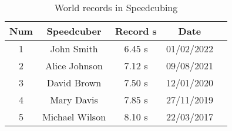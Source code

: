 \begin{table}[h]
\centering
\begin{tabular}{|c|c|c|c|c|}
\hline
Num & Speedcuber & Record s & Date \\
\hline
1 & John Smith & 6.45 s & 01/02/2022  \\
\hline
2 & Alice Johnson & 7.12 s & 09/08/2021  \\
\hline
3 & David Brown & 7.50 s & 12/01/2020  \\
\hline
4 & Mary Davis & 7.85 s & 27/11/2019  \\
\hline
5 & Michael Wilson & 8.10 s & 22/03/2017  \\
\hline

\end{tabular}
\caption{World records in Speedcubing}
\label{tab:table1}
\end{table}